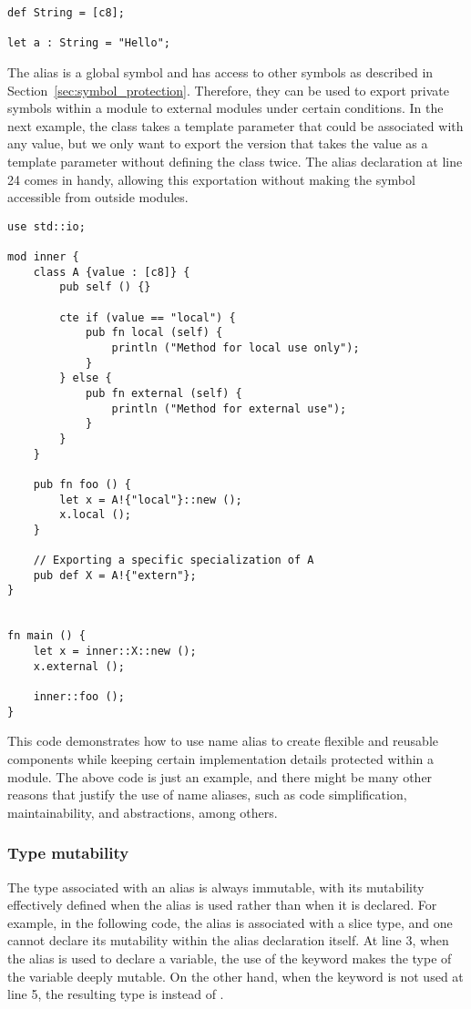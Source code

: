 \begin{lstlisting}[style=coloredverbatim]
def String = [c8];

let a : String = "Hello";
\end{lstlisting}

The alias is a global symbol and has access to other symbols as described in
Section~\ref{sec:symbol_protection}. Therefore, they can be used to export
private symbols within a module to external modules under certain conditions. In
the next example, the class  takes a template parameter that could be
associated with any value, but we only want to export the version that takes the
value  as a template parameter without defining the class twice.
The alias declaration  at line 24 comes in handy, allowing this
exportation without making the symbol  accessible from outside modules.

\begin{lstlisting}[style=coloredverbatim]
use std::io;

mod inner {
    class A {value : [c8]} {
        pub self () {}

        cte if (value == "local") {
            pub fn local (self) {
                println ("Method for local use only");
            }
        } else {
            pub fn external (self) {
                println ("Method for external use");
            }
        }
    }

    pub fn foo () {
        let x = A!{"local"}::new ();
        x.local ();
    }

    // Exporting a specific specialization of A
    pub def X = A!{"extern"};
}


fn main () {
    let x = inner::X::new ();
    x.external ();

    inner::foo ();
}
\end{lstlisting}

This code demonstrates how to use name alias to create flexible and reusable
components while keeping certain implementation details protected within a
module. The above code is just an example, and there might be many other reasons
that justify the use of name aliases, such as code simplification,
maintainability, and abstractions, among others.


\subsubsection{Type mutability}

The type associated with an alias is always immutable, with its mutability
effectively defined when the alias is used rather than when it is declared. For
example, in the following code, the alias  is associated with a
\token{[i32]} slice type, and one cannot declare its mutability within the alias
declaration itself. At line 3, when the alias  is used to
declare a variable, the use of the keyword  makes the type of the
variable deeply mutable. On the other hand, when the keyword  is not
used at line 5, the resulting type is  instead of .

